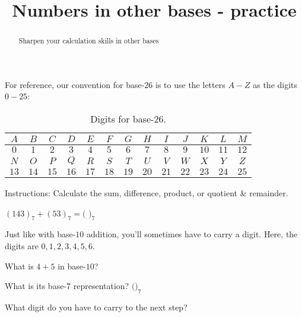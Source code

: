 \documentclass[handout,numbers]{ximera}
\title{Numbers in other bases - practice}
\begin{document}
\begin{abstract} {Sharpen your calculation skills in other bases}
\end{abstract}
\maketitle

For reference, our convention for base-$26$ is to use the letters $A-Z$ as the digits $0-25$:

\begin{table}
\centering
\caption{Digits for base-$26$.}
\begin{tabular}{|c|c|c|c|c|c|c|c|c|c|c|c|c|}
\hline
 $A$ & $B$ & $C$ & $D$ & $E$ & $F$ & $G$ & $H$ & $I$ & $J$ & $K$ & $L$ & $M$  \\
 \hline
$0$ & $1$ & $2$ & $3$ & $4$ & $5$ & $6$ & $7$ & $8$ & $9$ & $10$ & $11$ & $12$ \\
\hline
\hline
$N$ & $O$ & $P$ & $Q$ & $R$ & $S$ & $T$ & $U$ & $V$ & $W$ & $X$ & $Y$ & $Z$\\
\hline
$13$ & $14$ & $15$ & $16$ & $17$ & $18$ & $19$ & $20$ & $21$ & $22$ & $23$ & $24$ & $25$ \\
\hline
\end{tabular}
\end{table}

Instructions: Calculate the sum, difference, product, or quotient \& remainder.  

\begin{question}
	$(143)_7 + (53)_7 = ($ \qquad\qquad {}$)_7$
	\begin{hint} 
		Just like with base-$10$ addition, you'll sometimes have to carry a digit.  Here, the digits are $0, 1, 2, 3, 4, 5, 6$.

		\begin{prompt} 
			What is $4+5$ in base-$10$? \qquad\qquad {}
		\end{prompt}

		\begin{prompt} 
			What is its base-$7$ representation? $($\qquad\qquad \answer{(12)}$)_7$
		\end{prompt}

		\begin{prompt} 
			What digit do you have to carry to the next step? \answer{1}
		\end{prompt}
	\end{hint}
\end{question}
\end{document}
